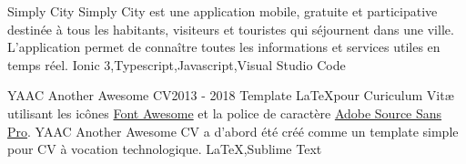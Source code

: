 %
%
%


\begin{projects}
	\project
	{Simply City}{}
	{ }
	{Simply City est une application mobile, gratuite et participative destinée à tous les habitants, visiteurs et touristes qui séjournent dans une ville. L’application permet de connaître toutes les informations et services utiles en temps réel.}
	{Ionic 3,Typescript,Javascript,Visual Studio Code}

	\project
	{YAAC Another Awesome CV}{2013 - 2018}
	{ }
	{Template \LaTeX pour Curiculum Vitæ utilisant les icônes \href{https://fontawesome.com}{Font Awesome} et la police de caractère \href{https://fonts.google.com/specimen/Source+Sans+Pro}{Adobe Source Sans Pro}. YAAC Another Awesome CV a d'abord été créé comme un template simple pour CV à vocation technologique.}
	{\LaTeX,Sublime Text}

\end{projects}

